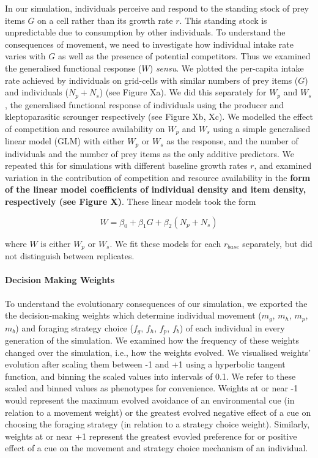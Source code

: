 \documentclass[11pt]{article}
\begin{document}
In our simulation, individuals perceive and respond to the standing stock of prey items $G$ on a cell rather than its growth rate $r$.
This standing stock is unpredictable due to consumption by other individuals.
To understand the consequences of movement, we need to investigate how individual intake rate varies with $G$ as well as the presence of potential competitors.
Thus we examined the generalised functional response ($W$) \textit{sensu}\citet{meer1997}.
We plotted the per-capita intake rate achieved by individuals on grid-cells with similar numbers of prey items ($G$) and individuals ($N_p + N_s$) (see Figure Xa).
We did this separately for $W_p$ and $W_s$, the generalised functional response of individuals using the producer and kleptoparasitic scrounger respectively (see Figure Xb, Xc).
We modelled the effect of competition and resource availability on $W_p$ and $W_s$ using a simple generalised linear model (GLM) with either $W_p$ or $W_s$ as the response, and the number of individuals and the number of prey items as the only additive predictors.
We repeated this for simulations with different baseline growth rates $r$, and examined variation in the contribution of competition and resource availability in the \textbf{form of the linear model coefficients of individual density and item density, respectively (see Figure X)}.
These linear models took the form
\begin{linenomath*}
    \begin{equation*}
        W = \beta_0 + \beta_1 G + \beta_2 (N_p + N_s)
    \end{equation*}
\end{linenomath*}
where $W$ is either $W_p$ or $W_s$.
We fit these models for each $r_{base}$ separately, but did not distinguish between replicates.

\paragraph{Decision Making Weights}

To understand the evolutionary consequences of our simulation, we exported the the decision-making weights which determine individual movement ($m_g$, $m_h$, $m_p$, $m_b$) and foraging strategy choice ($f_g$, $f_h$, $f_p$, $f_b$) of each individual in every generation of the simulation.
We examined how the frequency of these weights changed over the simulation, i.e., how the weights evolved.
We visualised weights' evolution after scaling them between -1 and +1 using a hyperbolic tangent function, and binning the scaled values into intervals of 0.1.
We refer to these scaled and binned values as phenotypes for convenience.
Weights at or near -1 would represent the maximum evolved avoidance of an environmental cue (in relation to a movement weight) or the greatest evolved negative effect of a cue on choosing the foraging strategy (in relation to a strategy choice weight).
Similarly, weights at or near +1 represent the greatest evovled preference for or positive effect of a cue on the movement and strategy choice mechanism of an individual.
\end{document}
